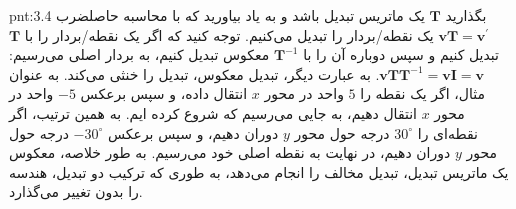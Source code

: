 {\begin{spacing}{1.5}
        \begin{point}{pnt:3.4}
            \Large
            بگذارید $\textbf{T}$ یک ماتریس تبدیل باشد و به یاد بیاورید که با محاسبه حاصلضرب $\textbf{vT}=\textbf{v}^\prime$ یک نقطه/بردار را تبدیل می‌کنیم.
            توجه کنید که اگر یک نقطه/بردار را با $\textbf{T}$ تبدیل کنیم و سپس دوباره آن را با $\textbf{T}^{-1}$ معکوس تبدیل کنیم،
            به بردار اصلی می‌رسیم: $\textbf{vT}\textbf{T}^{-1}=\textbf{vI}=\textbf{v}$.
            به عبارت دیگر، تبدیل معکوس، تبدیل را خنثی می‌کند.
            به عنوان مثال، اگر یک نقطه را $5$ واحد در محور $x$ انتقال داده، و سپس برعکس $-5$ واحد در محور $x$ انتقال دهیم، به جایی می‌رسیم که شروع کرده ایم.
            به همین ترتیب، اگر نقطه‌ای را $30^\circ$ درجه حول محور $y$ دوران دهیم، و سپس برعکس $-30^\circ$ درجه حول محور $y$ دوران دهیم، در نهایت به نقطه اصلی خود می‌رسیم.
            به طور خلاصه، معکوس یک ماتریس تبدیل، تبدیل مخالف را انجام می‌دهد، به طوری که ترکیب دو تبدیل، هندسه را بدون تغییر می‌گذارد.
        \end{point}
    \end{spacing}
}

